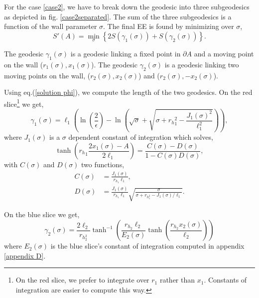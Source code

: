 For the case \ref{case2}, we have to break down the geodesic into three subgeodesics as depicted in fig. \ref{case2separated}. The sum of the three subgeodesics is a function of the wall parameter $\sigma$. The final EE is found by minimizing over $\sigma$,
\begin{equation}\label{second entropy}
    S'\left(A\right) = \min_\sigma\left\{2S\left(\gamma_1(\sigma)\right)+S\left(\gamma_2(\sigma)\right)\right\}.
\end{equation}

The geodesic $\gamma_1(\sigma)$ is a geodesic linking a fixed point in $\partial A$ and a moving point on the wall ($r_1(\sigma),x_1(\sigma)$). The geodesic $\gamma_2(\sigma)$ is a geodesic linking two moving points on the wall, ($r_2(\sigma),x_2(\sigma)$) and ($r_2(\sigma),-x_2(\sigma)$).

Using eq.(\ref{solution phi}), we compute the length of the two geodesics. On the red slice\footnote{On the red slice, we prefer to integrate over $r_1$ rather than $x_1$. Constants of integration are easier to compute this way.} we get,
\begin{equation}
    \gamma_1(\sigma)=\ell_1\left(\ln\left(\frac{2}{\epsilon}\right)-\ln\left(\sqrt{\sigma}+\sqrt{\sigma+{r_h}_1^2-\frac{J_1(\sigma)^2}{\ell_1^2}}\right)\right),
\end{equation}
where $J_1(\sigma)$ is a $\sigma$ dependent constant of integration which solves,
\begin{equation}\label{maconstante}
    \tanh \left( {r_h}_1 \frac{2x_1(\sigma) - A}{2\ell_1}\right) = \frac{C(\sigma)-D(\sigma)}{1-C(\sigma)D(\sigma)},
\end{equation}
with $C(\sigma)$ and $D(\sigma)$ two functions,
\begin{align}\label{CD}
    C(\sigma) &= \frac{J_1(\sigma)}{r_{h_1}\ell_1}, \\
    D(\sigma) &= \frac{J_1(\sigma)}{r_{h_1}\ell_1}\sqrt{\frac{\sigma}{\sigma+r_h_1^2-J_1(\sigma)/\ell_1}}.
\end{align}

On the blue slice we get,
\begin{equation}
    \gamma_2(\sigma)=\frac{2\ell_2}{r_h_2^2}\tanh^{-1}\left(\frac{r_h_2\ell_2}{E_2(\sigma)}\tanh\left(\frac{r_h_2x_2(\sigma)}{\ell_2}\right)\right)
\end{equation}
where $E_2(\sigma)$ is the blue slice's constant of integration computed in appendix \ref{appendix D}.


